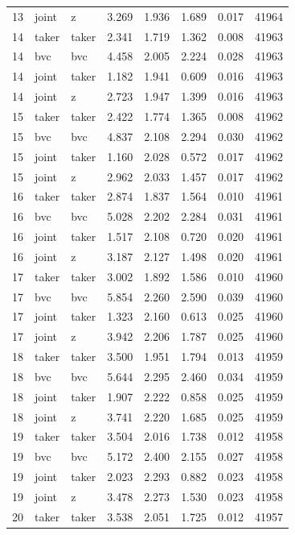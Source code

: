 \begin{tabular}{rllrrrrr}
13 & joint & z & 3.269 & 1.936 & 1.689 & 0.017 & 41964 \\
14 & taker & taker & 2.341 & 1.719 & 1.362 & 0.008 & 41963 \\
14 & bvc & bvc & 4.458 & 2.005 & 2.224 & 0.028 & 41963 \\
14 & joint & taker & 1.182 & 1.941 & 0.609 & 0.016 & 41963 \\
14 & joint & z & 2.723 & 1.947 & 1.399 & 0.016 & 41963 \\
15 & taker & taker & 2.422 & 1.774 & 1.365 & 0.008 & 41962 \\
15 & bvc & bvc & 4.837 & 2.108 & 2.294 & 0.030 & 41962 \\
15 & joint & taker & 1.160 & 2.028 & 0.572 & 0.017 & 41962 \\
15 & joint & z & 2.962 & 2.033 & 1.457 & 0.017 & 41962 \\
16 & taker & taker & 2.874 & 1.837 & 1.564 & 0.010 & 41961 \\
16 & bvc & bvc & 5.028 & 2.202 & 2.284 & 0.031 & 41961 \\
16 & joint & taker & 1.517 & 2.108 & 0.720 & 0.020 & 41961 \\
16 & joint & z & 3.187 & 2.127 & 1.498 & 0.020 & 41961 \\
17 & taker & taker & 3.002 & 1.892 & 1.586 & 0.010 & 41960 \\
17 & bvc & bvc & 5.854 & 2.260 & 2.590 & 0.039 & 41960 \\
17 & joint & taker & 1.323 & 2.160 & 0.613 & 0.025 & 41960 \\
17 & joint & z & 3.942 & 2.206 & 1.787 & 0.025 & 41960 \\
18 & taker & taker & 3.500 & 1.951 & 1.794 & 0.013 & 41959 \\
18 & bvc & bvc & 5.644 & 2.295 & 2.460 & 0.034 & 41959 \\
18 & joint & taker & 1.907 & 2.222 & 0.858 & 0.025 & 41959 \\
18 & joint & z & 3.741 & 2.220 & 1.685 & 0.025 & 41959 \\
19 & taker & taker & 3.504 & 2.016 & 1.738 & 0.012 & 41958 \\
19 & bvc & bvc & 5.172 & 2.400 & 2.155 & 0.027 & 41958 \\
19 & joint & taker & 2.023 & 2.293 & 0.882 & 0.023 & 41958 \\
19 & joint & z & 3.478 & 2.273 & 1.530 & 0.023 & 41958 \\
20 & taker & taker & 3.538 & 2.051 & 1.725 & 0.012 & 41957 \\

\end{tabular}
